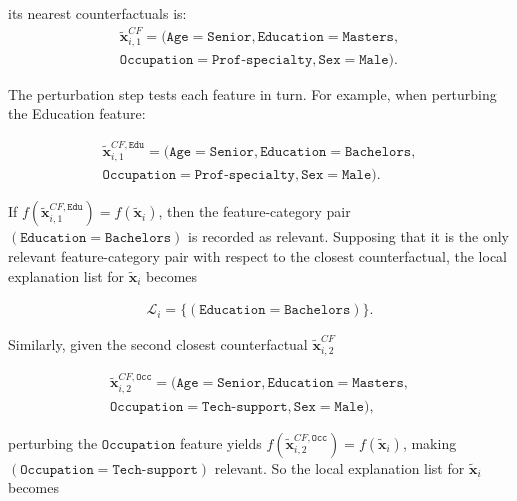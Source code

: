 its nearest counterfactuals is:
\begin{equation}
  \begin{aligned}
    \tilde{\mathbf{x}}_{i,1}^{CF} = (\texttt{Age}=\texttt{Senior}, \texttt{Education}=\texttt{Masters}, \\ 
    \texttt{Occupation}=\texttt{Prof-specialty}, \texttt{Sex}=\texttt{Male}).
  \end{aligned}
\end{equation}

The perturbation step tests each feature in turn. For example, when perturbing the Education feature:

\begin{equation}
  \begin{aligned}
    \tilde{\mathbf{x}}_{i,1}^{CF,\texttt{Edu}} = (\texttt{Age}=\texttt{Senior}, \texttt{Education}=\texttt{Bachelors},\\ 
    \texttt{Occupation}=\texttt{Prof-specialty}, \texttt{Sex}=\texttt{Male}).
  \end{aligned}
\end{equation}

If $f(\tilde{\mathbf{x}}_{i,1}^{CF,\texttt{Edu}}) = f(\tilde{\mathbf{x}}_i)$, then the feature-category pair $(\texttt{Education}=\texttt{Bachelors})$ is recorded as relevant. Supposing that it is the only relevant feature-category pair with respect to the closest counterfactual, the local explanation list for $\tilde{\mathbf{x}}_i$ becomes

\begin{equation}
  \begin{aligned}
    \mathcal{L}_i = \{(\texttt{Education}=\texttt{Bachelors})\}.
  \end{aligned}
\end{equation}

Similarly, given the second closest counterfactual $\tilde{\mathbf{x}}_{i,2}^{CF}$

\begin{equation}
  \begin{aligned}
    \tilde{\mathbf{x}}_{i,2}^{CF,\texttt{Occ}} = (\texttt{Age}=\texttt{Senior}, \texttt{Education}=\texttt{Masters},\\
    \texttt{Occupation}=\texttt{Tech-support}, \texttt{Sex}=\texttt{Male}),
  \end{aligned}
\end{equation}

perturbing the $\texttt{Occupation}$ feature yields $f(\tilde{\mathbf{x}}_{i,2}^{CF,\texttt{Occ}}) = f(\tilde{\mathbf{x}}_i)$, making $(\texttt{Occupation}=\texttt{Tech-support})$ relevant. So the local explanation list for $\tilde{\mathbf{x}}_i$ becomes

